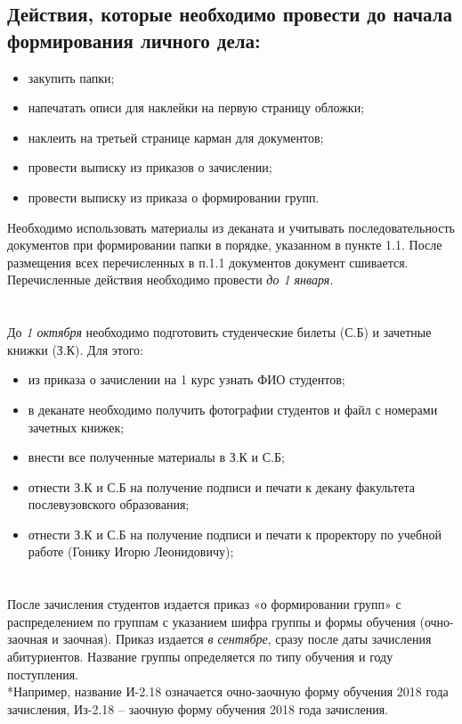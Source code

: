 \documentclass[utf8]{article}
\begin{document}
\begin{flushleft}
\subsection{Действия, которые необходимо провести до начала формирования личного дела:}
\begin{itemize}

\item закупить папки;
\item напечатать описи для наклейки на первую страницу обложки;
\item наклеить на третьей странице карман для документов;
\item провести выписку из приказов о зачислении;
\item провести выписку из приказа о формировании групп.
\end{itemize}
Необходимо использовать материалы из деканата и учитывать последовательность документов при формировании папки в порядке, указанном в пункте 1.1. После размещения всех перечисленных в п.1.1 документов документ сшивается.
Перечисленные действия необходимо провести \textit {до 1 января.}

\section{}
До \textit{1 октября} необходимо подготовить студенческие билеты (С.Б) и зачетные книжки (З.К). Для этого:
\begin{itemize}

\item из приказа о зачислении на 1 курс узнать ФИО студентов;
\item в деканате необходимо получить фотографии студентов и файл с номерами зачетных книжек; 
\item внести все полученные материалы в З.К и С.Б;
\item отнести З.К и С.Б на получение подписи и печати к декану факультета послевузовского образования;
\item отнести З.К и С.Б на получение подписи и печати к проректору по учебной работе (Гонику Игорю Леонидовичу);
\end{itemize}

\section{}
После зачисления студентов издается приказ «о формировании групп» с распределением по группам с указанием шифра группы и формы обучения (очно-заочная и заочная). Приказ издается \textit { в сентябре}, сразу после даты зачисления абитуриентов.
Название группы определяется по типу обучения и году поступления. \\*Например, название И-2.18 означается очно-заочную форму обучения 2018 года зачисления, Из-2.18 – заочную форму обучения 2018 года зачисления.



\end{flushleft}
\end{document}

